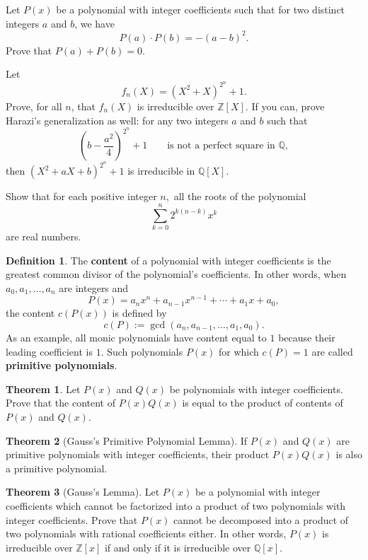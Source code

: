 \documentclass[12pt,a4paper]{memoir}
\theoremstyle{definition}
\newtheorem*{definition}{Definition}
\newtheorem{theorem}{Theorem}
\begin{document}
\begin{question}[name={1997 Iran Third Round}]
	Let $P(x)$ be a polynomial with integer coefficients such that for two distinct integers $a$ and $b$, we have \[P(a) \cdot P(b) = -(a-b)^2.\] Prove that $P(a)+P(b)=0$.
\end{question}


\begin{question}[name={1998 Romanian TST}]
	Let $$f_n(X) = (X^2 + X)^{2^n} +1.$$ Prove, for all $n$, that $f_n (X)$ is irreducible over $\mathbb Z[X]$. If you can, prove Harazi's generalization as well: for any two integers $a$ and $b$  such that \[\left(b-\frac{a^{2}}{4}\right)^{2^{n}}+1 \qquad \text{is not a perfect square in } \mathbb Q,\] then $(X^{2}+aX+b)^{2^{n}}+1$ is irreducible in $\mathbb{Q}[X]$.
\end{question}


\begin{question}[name={2014 Putnam}]
	Show that for each positive integer $n,$ all the roots of the polynomial\[\sum_{k=0}^n 2^{k(n-k)}x^k\]are real numbers. 
\end{question}


\begin{tcolorbox}[title={Content of a Polynomial \& Gauss's Lemma}]
	\begin{definition}
		The \textbf{content} of a polynomial with integer coefficients is the greatest common divisor of the polynomial's coefficients. In other words, when $a_0, a_1, \dots ,a_n$ are integers and 
		\[P(x)=a_nx^n+a_{n-1}x^{n-1}+ \cdots + a_1x+a_0,\]
		the content $c(P(x))$ is defined by
		\[c(P) := \gcd(a_n,a_{n-1},\dots,a_1,a_0).\]
		As an example, all monic polynomials have content equal to $1$ because their leading coefficient is $1$. Such polynomials $P(x)$ for which $c(P)=1$ are called \textbf{primitive polynomials}.
	\end{definition}
	
	
	\begin{theorem}
		Let $P(x)$ and $Q(x)$ be polynomials with integer coefficients. Prove that the content of $P(x)Q(x)$ is equal to the product of contents of $P(x)$ and $Q(x)$.
	\end{theorem}
	
	\begin{theorem}[Gauss's Primitive Polynomial Lemma]
		If $P(x)$ and $Q(x)$ are primitive polynomials with integer coefficients, their product $P(x)Q(x)$ is also a primitive polynomial.
	\end{theorem}
	
	\begin{theorem}[Gauss's Lemma]
		Let $P(x)$ be a polynomial with integer coefficients which cannot be factorized into a product of two polynomials with integer coefficients. Prove that $P(x)$ cannot be decomposed into a product of two polynomials with rational coefficients either. In other words, $P(x)$ is irreducible over $\mathbb Z[x]$ if and only if it is irreducible over $\mathbb Q[x]$.
	\end{theorem}
\end{tcolorbox}
\end{document}
